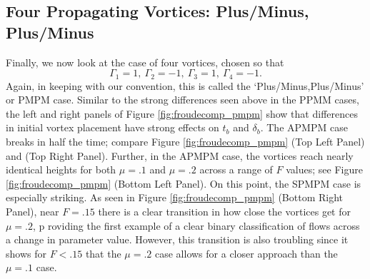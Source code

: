 \documentclass[a4paper,11pt]{article}
\begin{document}
\subsection{Four Propagating Vortices: Plus/Minus, Plus/Minus}
Finally, we now look at the case of four vortices, chosen so that
\[
\Gamma_{1}=1,~\Gamma_{2}=-1, ~ \Gamma_{3}=1,~\Gamma_{4}=-1.
\]
Again, in keeping with our convention, this is called the `Plus/Minus,Plus/Minus' or PMPM case.  Similar to the strong differences seen above in the PPMM cases, the left and right panels of Figure \ref{fig:froudecomp_pmpm} show that differences in initial vortex placement have strong effects on $t_{b}$ and $\delta_{b}$.  The APMPM case breaks in half the time; compare Figure \ref{fig:froudecomp_pmpm} (Top Left Panel) and (Top Right Panel).  Further, in the APMPM case, the vortices reach nearly identical heights for both $\mu=.1$ and $\mu=.2$ across a range of $F$ values; see Figure \ref{fig:froudecomp_pmpm} (Bottom Left Panel).  On this point, the SPMPM case is especially striking.  As seen in Figure \ref{fig:froudecomp_pmpm} (Bottom Right Panel), near $F=.15$ there is a clear transition in how close the vortices get for $\mu=.2$, p roviding the first example of a clear binary classification of flows across a change in parameter value.  However, this transition is also troubling since it shows for $F<.15$ that the $\mu=.2$ case allows for a closer approach than the $\mu=.1$ case.    
\end{document}
